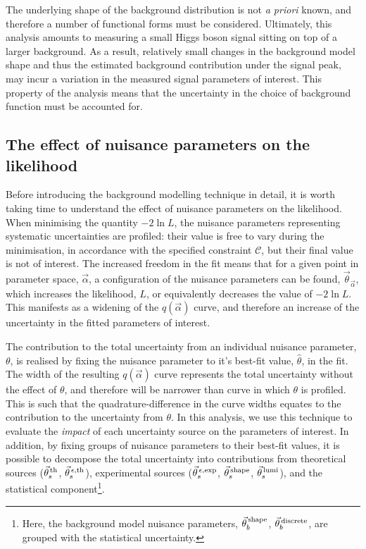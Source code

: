 The underlying shape of the background distribution is not \textit{a priori} known, and therefore a number of functional forms must be considered. Ultimately, this analysis amounts to measuring a small Higgs boson signal sitting on top of a larger background. As a result, relatively small changes in the background model shape and thus the estimated background contribution under the signal peak, may incur a variation in the measured signal parameters of interest. This property of the analysis means that the uncertainty in the choice of background function must be accounted for.

\subsection{The effect of nuisance parameters on the likelihood}
Before introducing the background modelling technique in detail, it is worth taking time to understand the effect of nuisance parameters on the likelihood. When minimising the quantity $-2\ln{L}$, the nuisance parameters representing systematic uncertainties are profiled: their value is free to vary during the minimisation, in accordance with the specified constraint $\mathcal{C}$, but their final value is not of interest. The increased freedom in the fit means that for a given point in parameter space, $\vec{\alpha}$, a configuration of the nuisance parameters can be found, $\vec{\theta}_{\vec{\alpha}}$, which increases the likelihood, $L$, or equivalently decreases the value of $-2\ln{L}$. This manifests as a widening of the $q(\vec{\alpha})$ curve, and therefore an increase of the uncertainty in the fitted parameters of interest.

The contribution to the total uncertainty from an individual nuisance parameter, $\theta$, is realised by fixing the nuisance parameter to it's best-fit value, $\hat{\theta}$, in the fit. The width of the resulting $q(\vec{\alpha})$ curve represents the total uncertainty without the effect of $\theta$, and therefore will be narrower than curve in which $\theta$ is profiled. This is such that the quadrature-difference in the curve widths equates to the contribution to the uncertainty from $\theta$. In this analysis, we use this technique to evaluate the \textit{impact} of each uncertainty source on the parameters of interest. In addition, by fixing groups of nuisance parameters to their best-fit values, it is possible to decompose the total uncertainty into contributions from theoretical sources ($\vec{\theta}^{\,\rm{th}}_{s}$, $\vec{\theta}^{\,\epsilon,{\rm{th}}}_{s}$), experimental sources ($\vec{\theta}^{\,\epsilon,{\rm{exp}}}_{s}$, $\vec{\theta}^{\,\rm{shape}}_{s}$, $\vec{\theta}^{\,\rm{lumi}}_{s}$), and the statistical component\footnote{Here, the background model nuisance parameters, $\vec{\theta}^{\,\rm{shape}}_{b}$, $\vec{\theta}^{\,\rm{discrete}}_{b}$, are grouped with the statistical uncertainty.}. 

